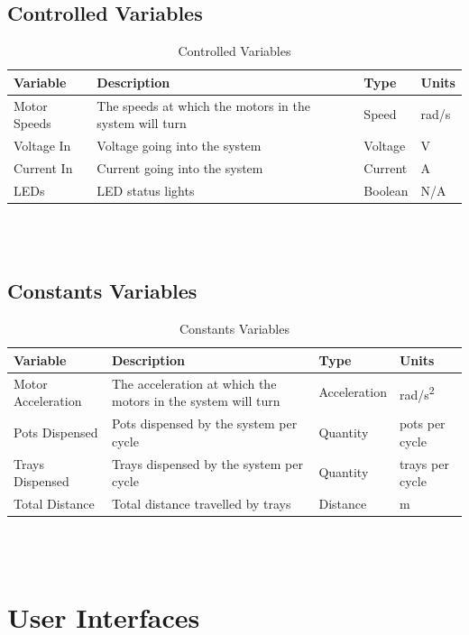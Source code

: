 \documentclass[12pt, titlepage]{article}
\begin{document}
\subsection{Controlled Variables}
\begin{table}[H]
\caption{Controlled Variables}
\begin{tabular}{ |p{3cm}|p{9cm}|p{2cm}|p{1cm}| }
  \hline
  Variable & Description & Type & Units\\
  \hline
  Motor Speeds & The speeds at which the motors in the system will turn
   & Speed & rad/s\\
  \hline
  Voltage In & Voltage going into the system
   & Voltage & V\\
  \hline
  Current In & Current going into the system
   & Current &  A\\
  \hline
  LEDs & LED status lights
   & Boolean & N/A\\
  
  \hline
 \end{tabular}\\\\
\end{table}

\subsection{Constants Variables}
\begin{table}[H]
  \caption{Constants Variables}
\begin{tabular}{ |p{3cm}|p{8.9cm}|p{2.1cm}|p{1cm}| }
  \hline
  Variable & Description & Type & Units\\
  \hline
  Motor Acceleration & The acceleration at which the motors in the system will turn
   & Acceleration & rad/s\textsuperscript{2}\\
  \hline
  Pots Dispensed & Pots dispensed by the system per cycle
   & Quantity & pots per cycle\\
  \hline
  Trays Dispensed & Trays dispensed by the system per cycle
   & Quantity &  trays per cycle\\
  \hline
  Total Distance & Total distance travelled by trays
   & Distance & m\\
  
  \hline
 \end{tabular}\\\\
\end{table}

\section{User Interfaces}
\end{document}

